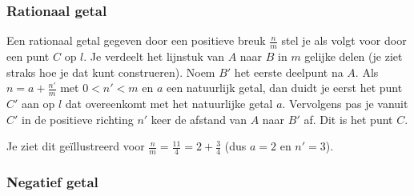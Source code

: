 \subsubsection{Rationaal getal}

Een rationaal getal gegeven door een positieve breuk $\frac{n}{m}$ stel je als volgt voor door een punt $C$ op $l$.
Je verdeelt het lijnstuk van $A$ naar $B$ in $m$ gelijke delen (je ziet straks hoe je dat kunt construeren).
Noem $B'$ het eerste deelpunt na $A$.
Als $n=a+\frac{n'}{m}$ met $0<n'<m$ en $a$ een natuurlijk getal, dan duidt je eerst het punt $C'$ aan op $l$ dat overeenkomt met het natuurlijke getal $a$.
Vervolgens pas je vanuit $C'$ in de positieve richting $n'$ keer de afstand van $A$ naar $B'$ af.
Dit is het punt $C$.

Je ziet dit ge\"illustreerd voor $\frac{n}{m}=\frac{11}{4}=2+\frac{3}{4}$ (dus $a=2$ en $n'=3$).\vspace{5mm}


%

\subsubsection{Negatief getal}

%

